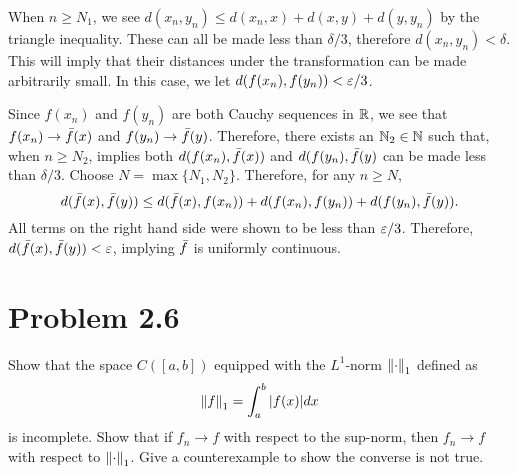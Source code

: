 \begin{solution}
\begin{itemize}[-]
        \jump
        When $n \geq N_1$, we see $d(x_n, y_n) \leq d(x_n, x) + d(x, y) + d(y, y_n)$ by the triangle inequality. These can all be made less than $\delta / 3$, therefore $d(x_n, y_n) < \delta$. This will imply that their distances under the transformation can be made arbitrarily small. In this case, we let $d(f(x_n), f(y_n)) < \varepsilon / 3$. \par

        \jump
        Since $f(x_n)$ and $f(y_n)$ are both Cauchy sequences in $\mathbb{R}$, we see that $f(x_n) \rightarrow \Bar{f}(x)$ and $f(y_n) \rightarrow \Bar{f}(y)$. Therefore, there exists an $\mathbb{N}_2 \in \mathbb{N}$ such that, when $n \geq N_2$, implies both $d(f(x_n), \Bar{f}(x))$ and $d(f(y_n), \Bar{f}(y)$ can be made less than $\delta / 3$. Choose $N = \max \{ N_1, N_2 \}$. Therefore, for any $n \geq N$, 
        \[d(\Bar{f}(x), \Bar{f}(y)) \leq d(\Bar{f}(x), f(x_n)) + d(f(x_n), f(y_n)) + d(f(y_n), \Bar{f}(y)).\]
        All terms on the right hand side were shown to be less than $\varepsilon / 3$. Therefore, $d(\Bar{f}(x), \Bar{f}(y)) < \varepsilon$, implying $\Bar{f}$ is uniformly continuous.
    \end{itemize}
\end{solution}

\newpage
\section{Problem 2.6}
Show that the space $C([a, b])$ equipped with the $L^1$-norm $\norm{\cdot}_1$ defined as 
\[\norm{f}_1 = \int_a^b |f(x)| dx\]
is incomplete. Show that if $f_n \rightarrow f$ with respect to the sup-norm, then $f_n \rightarrow f$ with respect to $\norm{\cdot}_1$. Give a counterexample to show the converse is not true.
\partbreak
\begin{solution}
    
\end{solution}
